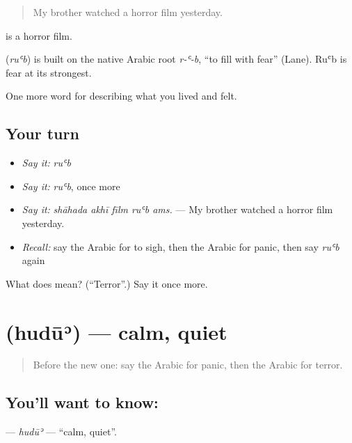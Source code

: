 \begin{quote}
My brother watched a horror film yesterday.
\end{quote}

  is a horror film.

\begin{cousinweb}
\textbf{} (\emph{ruʿb}) is built on the native Arabic root \emph{r-ʿ-b}, \textquotedblleft{}to fill with fear\textquotedblright{} (Lane). Ruʿb is fear at its strongest.
\end{cousinweb}

\begin{grammarlens}[title={What you've built}]
One more word for describing what you lived and felt.
\end{grammarlens}

\subsection*{Your turn}
\begin{itemize}
\raggedright
  \item \emph{Say it:} \emph{ruʿb}
  \item \emph{Say it:} \emph{ruʿb}, once more
  \item \emph{Say it:} \emph{shāhada akhī fīlm ruʿb ams.} — My brother watched a horror film yesterday.
  \item \emph{Recall:} say the Arabic for to sigh, then the Arabic for panic, then say \emph{ruʿb} again
\end{itemize}

\begin{tcolorbox}[breakable,colback=teal!4,colframe=teal!35!black,title={Before you move on}]
What does  mean? (\textquotedblleft{}Terror\textquotedblright{}.) Say it once more.
\end{tcolorbox}
\section[\texorpdfstring{\ar{هدوء} (hudūʾ)}{هدوء (hudūʾ)}]{ (hudūʾ) — calm, quiet}

\label{lesson:AR-C489-hudu}



\begin{quote}
Before the new one: say the Arabic for panic, then the Arabic for terror.
\end{quote}

\subsection*{You'll want to know: }
\textbf{} — \emph{hudūʾ} — \textquotedblleft{}calm, quiet\textquotedblright{}.

